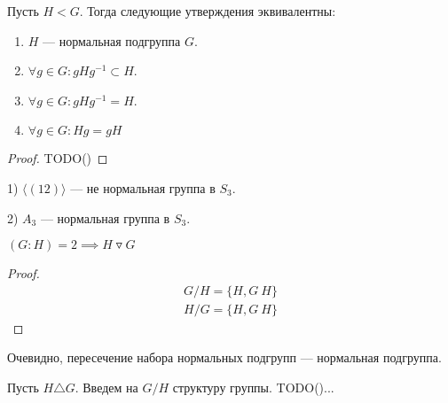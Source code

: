 \documentclass[../main.tex]{subfiles}
\begin{document}
\begin{theorem-non}
    Пусть $H < G$. Тогда следующие утверждения эквивалентны:
    \begin{enumerate}
        \item $H$ --- нормальная подгруппа $G$.
        \item $\forall g \in G\colon gHg^{-1} \subset H$.
        \item $\forall g \in G\colon gHg^{-1} = H$.
        \item $\forall g \in G\colon Hg = gH$
     \end{enumerate}
\end{theorem-non}
\begin{proof}
    TODO()
\end{proof}

\begin{examples}
    1) $\langle (1 2) \rangle$ --- не нормальная группа в $S_3$.

    2) $A_3$ --- нормальная группа в $S_3$.
\end{examples}
\begin{remark}
    $(G : H) = 2 \implies H \triangledown G$
\end{remark}
\begin{proof}
    \begin{equation*}
        \begin{gathered}
            G / H = \{H, G \ H\}\\
            H / G = \{H, G \ H\}
        \end{gathered}
    \end{equation*}
\end{proof}

Очевидно, пересечение набора нормальных подгрупп --- нормальная подгруппа.

Пусть $H \triangle G$. Введем на $G / H$ структуру группы. TODO()...
\end{document}
